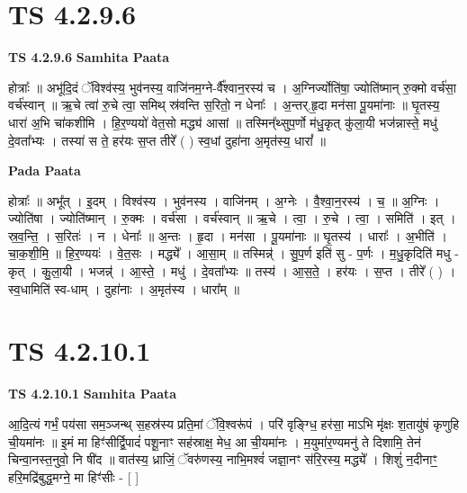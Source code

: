 \documentclass[17pt]{extarticle}
\begin{document}
\section*{ TS 4.2.9.6 }

\textbf{TS 4.2.9.6 } \newline
\textbf{Samhita Paata} \newline

होत्राः᳚ ॥ अभू॑दि॒दं ॅविश्व॑स्य॒ भुव॑नस्य॒ वाजि॑नम॒ग्ने-र्वै᳚श्वान॒रस्य॑ च । अ॒ग्निर्ज्योति॑षा॒ ज्योति॑ष्मान् रु॒क्मो वर्च॑सा॒ वर्च॑स्वान् ॥ ऋ॒चे त्वा॑ रु॒चे त्वा॒ समिथ् स्र॑वन्ति स॒रितो॒ न धेनाः᳚ । अ॒न्तर्.हृ॒दा मन॑सा पू॒यमा॑नाः ॥ घृ॒तस्य॒ धारा॑ अ॒भि चा॑कशीमि । हि॒र॒ण्ययो॑ वेत॒सो मद्ध्य॑ आसां ॥ तस्मिन्᳚थ्सुप॒र्णो म॑धु॒कृत् कु॑ला॒यी भज॑न्नास्ते॒ मधु॑ दे॒वता᳚भ्यः । तस्या॑ स ते॒ हर॑यः स॒प्त तीरे᳚ ( ) स्व॒धां दुहा॑ना अ॒मृत॑स्य॒ धारां᳚ ॥ \newline

\textbf{Pada Paata} \newline

होत्राः᳚ ॥ अभू᳚त् । इ॒दम् । विश्व॑स्य । भुव॑नस्य । वाजि॑नम् । अ॒ग्नेः । वै॒श्वा॒न॒रस्य॑ । च॒ ॥ अ॒ग्निः । ज्योति॑षा । ज्योति॑ष्मान् । रु॒क्मः । वर्च॑सा । वर्च॑स्वान् ॥ ऋ॒चे । त्वा॒ । रु॒चे । त्वा॒ । समिति॑ । इत् । स्र॒व॒न्ति॒ । स॒रितः॑ । न । धेनाः᳚ ॥ अ॒न्तः । हृ॒दा । मन॑सा । पू॒यमा॑नाः ॥ घृ॒तस्य॑ । धाराः᳚ । अ॒भीति॑ । चा॒क॒शी॒मि॒ ॥ हि॒र॒ण्ययः॑ । वे॒त॒सः । मद्ध्ये᳚ । आ॒सा॒म् ॥ तस्मिन्न्॑ । सु॒प॒र्ण इति॑ सु - प॒र्णः । म॒धु॒कृदिति॑ मधु - कृत् । कु॒ला॒यी । भजन्न्॑ । आ॒स्ते॒ । मधु॑ । दे॒वता᳚भ्यः ॥ तस्य॑ । आ॒स॒ते॒ । हर॑यः । स॒प्त । तीरे᳚ ( ) । स्व॒धामिति॑ स्व-धाम् । दुहा॑नाः । अ॒मृत॑स्य । धारा᳚म् ॥  \newline




\section*{ TS 4.2.10.1 }

\textbf{TS 4.2.10.1 } \newline
\textbf{Samhita Paata} \newline

आ॒दि॒त्यं गर्भं॒ पय॑सा सम॒ञ्जन्थ् स॒हस्र॑स्य प्रति॒मां ॅवि॒श्वरू॑पं । परि॑ वृङ्ग्धि॒ हर॑सा॒ माऽभि मृ॑क्षः श॒तायु॑षं कृणुहि ची॒यमा॑नः ॥ इ॒मं मा हिꣳ॑सीर्द्वि॒पादं॑ पशू॒नाꣳ सह॑स्राक्ष॒ मेध॒ आ ची॒यमा॑नः । म॒युमा॑र॒ण्यमनु॑ ते दिशामि॒ तेन॑ चिन्वा॒नस्त॒नुवो॒ नि षी॑द ॥ वात॑स्य॒ ध्राजिं॒ ॅवरु॑णस्य॒ नाभि॒मश्वं॑ जज्ञा॒नꣳ स॑रि॒रस्य॒ मद्ध्ये᳚ । शिशुं॑ न॒दीनाꣳ॒॒ हरि॒मद्रि॑बुद्ध॒मग्ने॒ मा हिꣳ॑सीः - [  ] \newline
\end{document}

